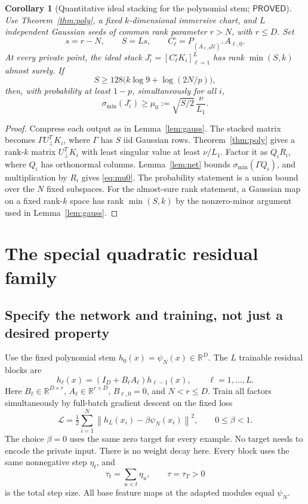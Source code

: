 \documentclass[12pt,a4paper]{article}
\theoremstyle{readable}
\newtheorem{corollary}[theorem]{Corollary}
\theoremstyle{definition}\newtheorem{example}[theorem]{Example}
\newcommand{\R}{\mathbb R}\newcommand{\rank}{\operatorname{rank}}
\newcommand{\norm}[1]{\left\|#1\right\|}
\newcommand{\PP}{\mathsf{PROVED}}\newcommand{\FF}{\mathsf{FALSE}}
\begin{document}
\begin{corollary}[Quantitative ideal stacking for the polynomial stem; \(\PP\)]\label{cor:stackpoly}
Use Theorem~\ref{thm:poly}, a fixed \(k\)-dimensional immersive chart, and \(L\) independent Gaussian seeds of common rank parameter \(r>N\), with \(r\le D\). Set
\[
s=r-N,\qquad S=Ls,\qquad
C_\ell^\circ=P_{(A_{\ell,0}\mathcal U)^\perp}A_{\ell,0}.
\]
At every private point, the ideal stack \(J_i^\circ=[C_\ell^\circ K_i]_{\ell=1}^L\) has rank \(\min(S,k)\) almost surely. If
\[
S\ge128\bigl(k\log9+\log(2N/p)\bigr),
\]
then, with probability at least \(1-p\), simultaneously for all \(i\),
\begin{equation}\label{eq:mu0}
\sigma_{\min}(J_i^\circ)\ge
\mu_0:=\sqrt{S/2}\,\frac{\nu}{L_1}.
\end{equation}
\end{corollary}
\begin{proof}
Compress each output as in Lemma~\ref{lem:gauss}. The stacked matrix becomes
\(\Gamma U_\perp^TK_i\), where \(\Gamma\) has \(S\) iid Gaussian rows. Theorem~\ref{thm:poly} gives a rank-\(k\) matrix \(U_\perp^TK_i\) with least singular value at least \(\nu/L_1\). Factor it as \(Q_iR_i\), where \(Q_i\) has orthonormal columns. Lemma~\ref{lem:net} bounds \(\sigma_{\min}(\Gamma Q_i)\), and multiplication by \(R_i\) gives \eqref{eq:mu0}. The probability statement is a union bound over the \(N\) fixed subspaces. For the almost-sure rank statement, a Gaussian map on a fixed rank-\(k\) space has rank \(\min(S,k)\) by the nonzero-minor argument used in Lemma~\ref{lem:gauss}.
\end{proof}

\section{The special quadratic residual family}
\label{sec:anchor}

\subsection{Specify the network and training, not just a desired property}
Use the fixed polynomial stem \(h_0(x)=\psi_N(x)\in\R^D\). The \(L\) trainable residual blocks are
\begin{equation}\label{eq:anchor-net}
h_\ell(x)=(I_D+B_\ell A_\ell)h_{\ell-1}(x),
\qquad \ell=1,\ldots,L.
\end{equation}
Here \(B_\ell\in\R^{D\times r}\), \(A_\ell\in\R^{r\times D}\), \(B_{\ell,0}=0\), and \(N<r\le D\). Train all factors simultaneously by full-batch gradient descent on the fixed loss
\begin{equation}\label{eq:anchor-loss}
\mathcal L=\tfrac12\sum_{i=1}^N
\norm{h_L(x_i)-\beta\psi_N(x_i)}^2,
\qquad 0\le\beta<1.
\end{equation}
The choice \(\beta=0\) uses the same zero target for every example. No target needs to encode the private input. There is no weight decay here. Every block uses the same nonnegative step \(\eta_t\), and
\[
\tau_t=\sum_{u<t}\eta_u,\qquad \tau=\tau_T>0
\]
is the total step size. All base feature maps at the adapted modules equal \(\psi_N\).
\end{document}
